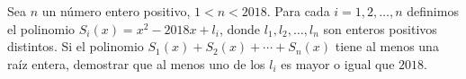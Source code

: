 Sea $n$ un número entero positivo, $1<n<2018$. Para cada $i=1, 2, \ldots ,n$ definimos el polinomio $S_i(x)=x^2-2018x+l_i$, donde $l_1, l_2, \ldots, l_n$ son enteros positivos distintos. Si el polinomio $S_1(x)+S_2(x)+\cdots+S_n(x)$ tiene al menos una raíz entera, demostrar que al menos uno de los $l_i$ es mayor o igual que $2018$.
